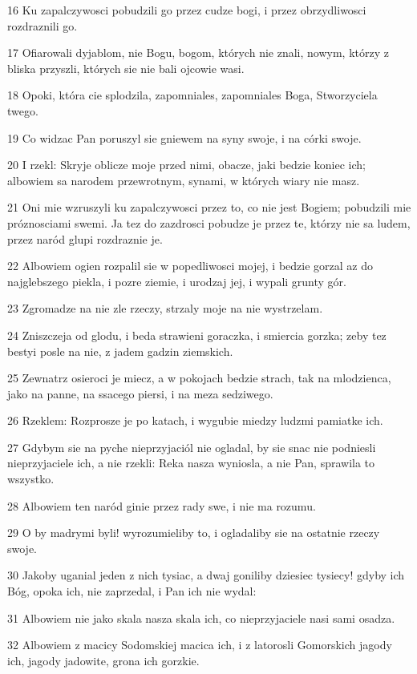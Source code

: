 \par 16 Ku zapalczywosci pobudzili go przez cudze bogi, i przez obrzydliwosci rozdraznili go.
\par 17 Ofiarowali dyjablom, nie Bogu, bogom, których nie znali, nowym, którzy z bliska przyszli, których sie nie bali ojcowie wasi.
\par 18 Opoki, która cie splodzila, zapomniales, zapomniales Boga, Stworzyciela twego.
\par 19 Co widzac Pan poruszyl sie gniewem na syny swoje, i na córki swoje.
\par 20 I rzekl: Skryje oblicze moje przed nimi, obacze, jaki bedzie koniec ich; albowiem sa narodem przewrotnym, synami, w których wiary nie masz.
\par 21 Oni mie wzruszyli ku zapalczywosci przez to, co nie jest Bogiem; pobudzili mie próznosciami swemi. Ja tez do zazdrosci pobudze je przez te, którzy nie sa ludem, przez naród glupi rozdraznie je.
\par 22 Albowiem ogien rozpalil sie w popedliwosci mojej, i bedzie gorzal az do najglebszego piekla, i pozre ziemie, i urodzaj jej, i wypali grunty gór.
\par 23 Zgromadze na nie zle rzeczy, strzaly moje na nie wystrzelam.
\par 24 Zniszczeja od glodu, i beda strawieni goraczka, i smiercia gorzka; zeby tez bestyi posle na nie, z jadem gadzin ziemskich.
\par 25 Zewnatrz osieroci je miecz, a w pokojach bedzie strach, tak na mlodzienca, jako na panne, na ssacego piersi, i na meza sedziwego.
\par 26 Rzeklem: Rozprosze je po katach, i wygubie miedzy ludzmi pamiatke ich.
\par 27 Gdybym sie na pyche nieprzyjaciól nie ogladal, by sie snac nie podniesli nieprzyjaciele ich, a nie rzekli: Reka nasza wyniosla, a nie Pan, sprawila to wszystko.
\par 28 Albowiem ten naród ginie przez rady swe, i nie ma rozumu.
\par 29 O by madrymi byli! wyrozumieliby to, i ogladaliby sie na ostatnie rzeczy swoje.
\par 30 Jakoby uganial jeden z nich tysiac, a dwaj goniliby dziesiec tysiecy! gdyby ich Bóg, opoka ich, nie zaprzedal, i Pan ich nie wydal:
\par 31 Albowiem nie jako skala nasza skala ich, co nieprzyjaciele nasi sami osadza.
\par 32 Albowiem z macicy Sodomskiej macica ich, i z latorosli Gomorskich jagody ich, jagody jadowite, grona ich gorzkie.
